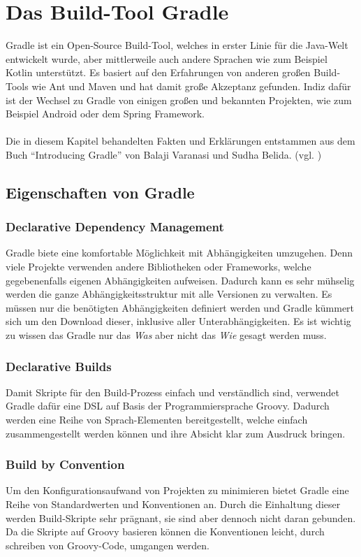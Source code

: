 \section{Das Build-Tool Gradle}
Gradle ist ein Open-Source Build-Tool, welches in erster Linie für die Java-Welt entwickelt wurde, aber mittlerweile auch andere Sprachen wie zum Beispiel Kotlin unterstützt. Es basiert auf den Erfahrungen von anderen großen Build-Tools wie Ant und Maven und hat damit große Akzeptanz gefunden. Indiz dafür ist der Wechsel zu Gradle von einigen großen und bekannten Projekten, wie zum Beispiel Android oder dem Spring Framework.\\
\\
Die in diesem Kapitel behandelten Fakten und Erklärungen entstammen aus dem Buch \enquote{Introducing Gradle} von Balaji Varanasi und Sudha Belida. (vgl. \cite{introducingGradle})

\subsection{Eigenschaften von Gradle}
\subsubsection{Declarative Dependency Management}
Gradle biete eine komfortable Möglichkeit mit Abhängigkeiten umzugehen. Denn viele Projekte verwenden andere Bibliotheken oder Frameworks, welche gegebenenfalls eigenen Abhängigkeiten aufweisen. Dadurch kann es sehr mühselig werden die ganze Abhängigkeitsstruktur mit alle Versionen zu verwalten. Es müssen nur die benötigten Abhängigkeiten definiert werden und Gradle kümmert sich um den Download dieser, inklusive aller Unterabhängigkeiten. Es ist wichtig zu wissen das Gradle nur das \textit{Was} aber nicht das \textit{Wie} gesagt werden muss.

\subsubsection{Declarative Builds}
Damit Skripte für den Build-Prozess einfach und verständlich sind, verwendet Gradle dafür eine \gls{DSL} auf Basis der Programmiersprache Groovy. Dadurch werden eine Reihe von Sprach-Elementen bereitgestellt, welche einfach zusammengestellt werden können und ihre Absicht klar zum Ausdruck bringen.

\subsubsection{Build by Convention}
Um den Konfigurationsaufwand von Projekten zu minimieren bietet Gradle eine Reihe von Standardwerten und Konventionen an. Durch die Einhaltung dieser werden Build-Skripte sehr prägnant, sie sind aber dennoch nicht daran gebunden. Da die Skripte auf Groovy basieren können die Konventionen leicht, durch schreiben von Groovy-Code, umgangen werden.

